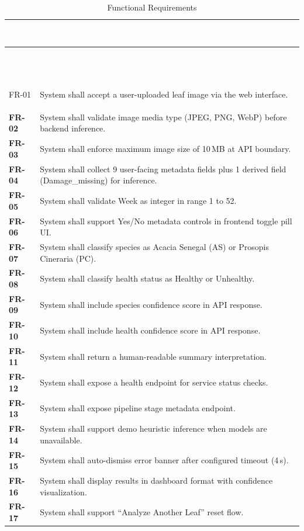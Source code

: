 \documentclass[11pt,a4paper,oneside]{report}
\begin{document}
\begin{longtable}{>{\bfseries\footnotesize}p{1.2cm} p{12.5cm}}
\caption{Functional Requirements} \label{tab:fr-trace} \\
\toprule
\rowcolor{tableheader}
\textcolor{white}{FR ID} & \textcolor{white}{Requirement Description} \\
\midrule
\endfirsthead
\multicolumn{2}{c}{\footnotesize\tablename\ \thetable{} -- continued} \\
\toprule
\rowcolor{tableheader}
\textcolor{white}{FR ID} & \textcolor{white}{Requirement Description} \\
\midrule
\endhead
\midrule
\multicolumn{2}{r}{\footnotesize\itshape Continued on next page} \\
\endfoot
\bottomrule
\endlastfoot

FR-01 & System shall accept a user-uploaded leaf image via the web interface. \\
\rowcolor{tablerow}
FR-02 & System shall validate image media type (JPEG, PNG, WebP) before backend inference. \\
FR-03 & System shall enforce maximum image size of 10\,MB at API boundary. \\
\rowcolor{tablerow}
FR-04 & System shall collect 9 user-facing metadata fields plus 1 derived field (Damage\_missing) for inference. \\
FR-05 & System shall validate Week as integer in range 1 to 52. \\
\rowcolor{tablerow}
FR-06 & System shall support Yes/No metadata controls in frontend toggle pill UI. \\
FR-07 & System shall classify species as Acacia Senegal (AS) or Prosopis Cineraria (PC). \\
\rowcolor{tablerow}
FR-08 & System shall classify health status as Healthy or Unhealthy. \\
FR-09 & System shall include species confidence score in API response. \\
\rowcolor{tablerow}
FR-10 & System shall include health confidence score in API response. \\
FR-11 & System shall return a human-readable summary interpretation. \\
\rowcolor{tablerow}
FR-12 & System shall expose a health endpoint for service status checks. \\
FR-13 & System shall expose pipeline stage metadata endpoint. \\
\rowcolor{tablerow}
FR-14 & System shall support demo heuristic inference when models are unavailable. \\
FR-15 & System shall auto-dismiss error banner after configured timeout (4\,s). \\
\rowcolor{tablerow}
FR-16 & System shall display results in dashboard format with confidence visualization. \\
FR-17 & System shall support ``Analyze Another Leaf'' reset flow. \\

\end{longtable}
\end{document}
